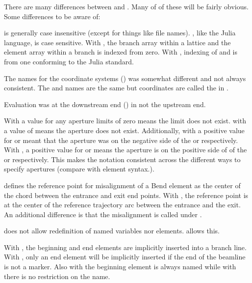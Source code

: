 There are many differences between \accellat and \bmad. Many of of these will be fairly
obvious. Some differences to be aware of:
\begin{description}
\item
\bmad is generally case insensitive (except for things like file names). \accellat, like
the Julia language, is case sensitive.
%
With \bmad, the branch array within a lattice and the element array within a branch is
indexed from zero. With \scibmad, indexing of  and  is 
from one conforming to the Julia standard.
%
\item
The \bmad names for the coordinate systems () was somewhat different and not
always consistent. The  and  names are the same but 
coordinates are called the  in \bmad.
%
\item
Evaluation was at the downstream end () in \bmad not the upstream end.
%
\item
With \bmad a value for any aperture limits of zero means the limit does not exist.
with \accellat a value of  means the aperture does not exist. Additionally, with
\bmad a positive value for  or  meant that the aperture was
on the negative side of the  or  respectively. With \accellat, a positive
value for  or  means the aperture is on the positive side of 
of the  or  respectively. This makes the notation consistent across 
the different ways to specify apertures (compare with  element syntax.).
%
\item
\accellat defines the reference point for misalignment of a Bend element as the center 
of the chord between the entrance and exit end points. 
With \bmad, the reference point is at the center of the reference trajectory arc between the entrance
and the exit. An additional difference is that the \bmad {} misalignment is called 
under \accellat.
%
\item
\bmad does not allow redefinition of named variables nor elements. \accellat allows this.
%
\item
With \bmad, the beginning and end elements are implicitly inserted into a branch line.
With \accellat, only an end element will be implicitly inserted if the end of the beamline is
not a marker. 
Also with \bmad the beginning element is always named  while with \accellat there
is no restriction on the name. 
%

\end{description}

